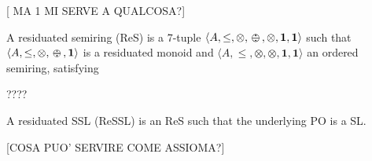 \documentclass{llncs}
\def\1{{\mathbf 1}}
\def\monid{{\mathbf 0}}
\def\1{{\mathbf 1}}
\def\monop{\otimes}
\def\odiv{\, {\ominus\hspace{-7.7pt} \div} \,}
\def\monid{\mathbf{1}}
\begin{document}
{[ MA 1 MI SERVE A QUALCOSA?]

\begin{definition}[residuation, II]
	A residuated semiring (ReS) is a 7-tuple $\langle A, \leq, \monop, \odiv, \monop, \monid, \1 \rangle$
	such that	$\langle A, \leq, \monop, \odiv, \monid \rangle$
	 is a residuated monoid and $\langle A, \leq, \monop, \monop, \monid, \1 \rangle$ an ordered semiring,
	  satisfying 
	\begin{itemize}
            ????
	\end{itemize}
	A residuated SSL (ReSSL) is an ReS such that the underlying PO is a SL.
\end{definition}

[COSA PUO' SERVIRE COME ASSIOMA?]

%
}
\end{document}
